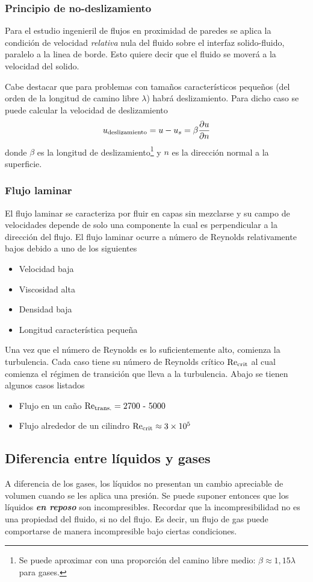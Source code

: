 \subsubsection{Principio de no-deslizamiento}
Para el estudio ingenieril de flujos en proximidad de paredes se aplica la condición de velocidad \textit{relativa} nula del fluido sobre el interfaz solido-fluido, paralelo a la linea de borde. Esto quiere decir que el fluido se moverá a la velocidad del solido.

Cabe destacar que para problemas con tamaños característicos pequeños (del orden de la longitud de camino libre $\lambda$) habrá deslizamiento. Para dicho caso se puede calcular la velocidad de deslizamiento
\[
u_{\textrm{deslizamiento}}=u-u_s=\beta \frac{\partial u}{\partial n}
\]
donde $\beta$ es la longitud de deslizamiento\footnote{Se puede aproximar con una proporción del camino libre medio: $\beta\approx 1,15\lambda$ para gases.} y $n$ es la dirección normal a la superficie.

\subsubsection{Flujo laminar}
El flujo laminar se caracteriza por fluir en capas sin mezclarse y su campo de velocidades depende de solo una componente la cual es perpendicular a la dirección del flujo. El flujo laminar ocurre a número de Reynolds relativamente bajos debido a uno de los siguientes
\begin{itemize}
    \item Velocidad baja
    \item Viscosidad alta
    \item Densidad baja
    \item Longitud característica pequeña
\end{itemize}

Una vez que el número de Reynolds es lo suficientemente alto, comienza la turbulencia. Cada caso tiene su número de Reynolds crítico $\textrm{Re}_{\textrm{crit}}$ al cual comienza el régimen de transición que lleva a la turbulencia. Abajo se tienen algunos casos listados
\begin{itemize}
    \item Flujo en un caño $\textrm{Re}_\textrm{trans.}=2700\mbox{ - }5000$
    \item Flujo alrededor de un cilindro $\textrm{Re}_{\textrm{crit}} \approx \num{3e5}$
\end{itemize}

\subsection{Diferencia entre líquidos y gases}
A diferencia de los gases, los líquidos no presentan un cambio apreciable de volumen cuando se les aplica una presión. Se puede suponer entonces que los líquidos \textbf{\textit{en reposo}} son incompresibles. Recordar que la incompresibilidad no es una propiedad del fluido, si no del flujo. Es decir, un flujo de gas puede comportarse de manera incompresible bajo ciertas condiciones.

